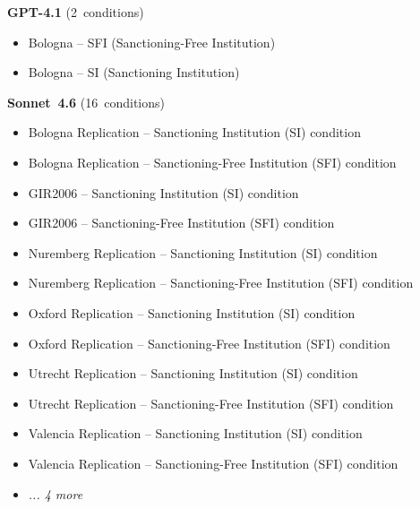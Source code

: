 \documentclass[11pt,a4paper]{article}
\begin{document}
          \begin{tcolorbox}[
            title={\textbf{sonnet\_different} (match 0\%) --- DOI: 10.1093\_pnasnexus\_pgad091},
            colback=red!4!white, colframe=red!55!black,
            fonttitle=\small\sffamily,
            sidebyside, sidebyside align=top seam,
            lower separated=false, breakable,
            before upper={\small}, before lower={\small},
          ]
          \textbf{GPT-4.1} (2~conditions)\\[4pt]
          \begin{itemize}[leftmargin=*,noitemsep,topsep=0pt]
            \item Bologna – SFI (Sanctioning-Free Institution)
\item Bologna – SI (Sanctioning Institution)
          \end{itemize}
          \tcblower
          \textbf{Sonnet~4.6} (16~conditions)\\[4pt]
          \begin{itemize}[leftmargin=*,noitemsep,topsep=0pt]
            \item Bologna Replication – Sanctioning Institution (SI) condition
\item Bologna Replication – Sanctioning-Free Institution (SFI) condition
\item GIR2006 – Sanctioning Institution (SI) condition
\item GIR2006 – Sanctioning-Free Institution (SFI) condition
\item Nuremberg Replication – Sanctioning Institution (SI) condition
\item Nuremberg Replication – Sanctioning-Free Institution (SFI) condition
\item Oxford Replication – Sanctioning Institution (SI) condition
\item Oxford Replication – Sanctioning-Free Institution (SFI) condition
\item Utrecht Replication – Sanctioning Institution (SI) condition
\item Utrecht Replication – Sanctioning-Free Institution (SFI) condition
\item Valencia Replication – Sanctioning Institution (SI) condition
\item Valencia Replication – Sanctioning-Free Institution (SFI) condition
\item \textit{... 4 more}
          \end{itemize}
          \end{tcolorbox}
\end{document}
